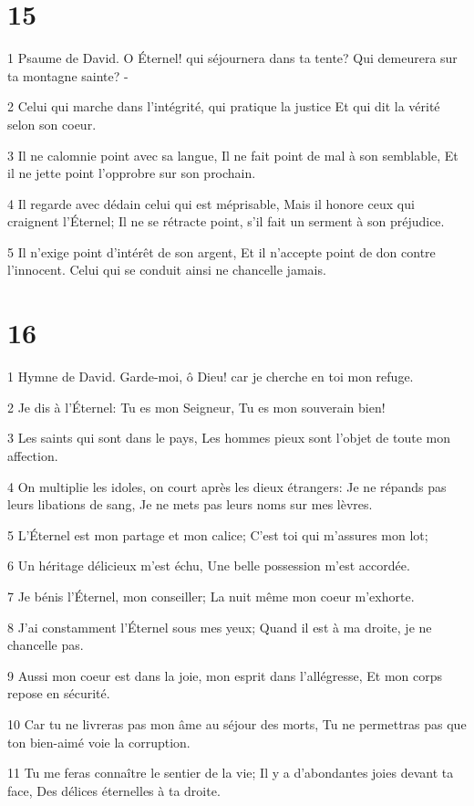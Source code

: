 \chapter{15}

\par 1 Psaume de David. O Éternel! qui séjournera dans ta tente? Qui demeurera sur ta montagne sainte? -
\par 2 Celui qui marche dans l'intégrité, qui pratique la justice Et qui dit la vérité selon son coeur.
\par 3 Il ne calomnie point avec sa langue, Il ne fait point de mal à son semblable, Et il ne jette point l'opprobre sur son prochain.
\par 4 Il regarde avec dédain celui qui est méprisable, Mais il honore ceux qui craignent l'Éternel; Il ne se rétracte point, s'il fait un serment à son préjudice.
\par 5 Il n'exige point d'intérêt de son argent, Et il n'accepte point de don contre l'innocent. Celui qui se conduit ainsi ne chancelle jamais.

\chapter{16}

\par 1 Hymne de David. Garde-moi, ô Dieu! car je cherche en toi mon refuge.
\par 2 Je dis à l'Éternel: Tu es mon Seigneur, Tu es mon souverain bien!
\par 3 Les saints qui sont dans le pays, Les hommes pieux sont l'objet de toute mon affection.
\par 4 On multiplie les idoles, on court après les dieux étrangers: Je ne répands pas leurs libations de sang, Je ne mets pas leurs noms sur mes lèvres.
\par 5 L'Éternel est mon partage et mon calice; C'est toi qui m'assures mon lot;
\par 6 Un héritage délicieux m'est échu, Une belle possession m'est accordée.
\par 7 Je bénis l'Éternel, mon conseiller; La nuit même mon coeur m'exhorte.
\par 8 J'ai constamment l'Éternel sous mes yeux; Quand il est à ma droite, je ne chancelle pas.
\par 9 Aussi mon coeur est dans la joie, mon esprit dans l'allégresse, Et mon corps repose en sécurité.
\par 10 Car tu ne livreras pas mon âme au séjour des morts, Tu ne permettras pas que ton bien-aimé voie la corruption.
\par 11 Tu me feras connaître le sentier de la vie; Il y a d'abondantes joies devant ta face, Des délices éternelles à ta droite.


